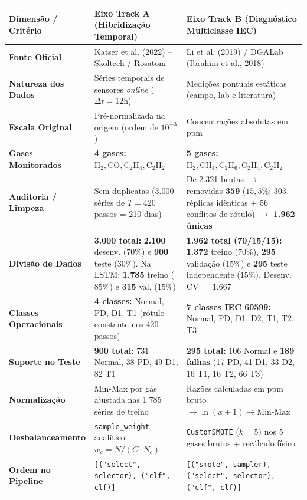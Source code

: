 \documentclass[10pt,a4paper]{article}
\begin{document}
\begin{table}[H]
\centering\footnotesize
\renewcommand{\arraystretch}{1.18}
\begin{tabularx}{\textwidth}{l X X}
\toprule
\textbf{Dimensão / Critério} & \textbf{Eixo Track A (Hibridização Temporal)} & \textbf{Eixo Track B (Diagnóstico Multiclasse IEC)} \\
\midrule
\textbf{Fonte Oficial} & Katser et al. (2022) -- Skoltech / Rosatom & Li et al. (2019) / DGALab (Ibrahim et al., 2018) \\
\textbf{Natureza dos Dados} & Séries temporais de sensores \textit{online} ($\Delta t = 12\text{h}$) & Medições pontuais estáticas (campo, lab e literatura) \\
\textbf{Escala Original} & Pré-normalizada na origem (ordem de $10^{-3}$) & Concentrações absolutas em $\text{ppm}$ \\
\textbf{Gases Monitorados} & \textbf{4 gases:} $\text{H}_2, \text{CO}, \text{C}_2\text{H}_4, \text{C}_2\text{H}_2$ & \textbf{5 gases:} $\text{H}_2, \text{CH}_4, \text{C}_2\text{H}_6, \text{C}_2\text{H}_4, \text{C}_2\text{H}_2$ \\
\textbf{Auditoria / Limpeza} & Sem duplicatas (3.000 séries de $T=420$ passos = 210 dias) & De 2.321 brutas $\to$ removidas \textbf{359} ($15{,}5\%$: 303 réplicas idênticas + 56 conflitos de rótulo) $\to$ \textbf{1.962 únicas} \\
\textbf{Divisão de Dados} & \textbf{3.000 total:} \textbf{2.100} desenv. ($70\%$) e \textbf{900} teste ($30\%$). Na LSTM: \textbf{1.785} treino ($85\%$) e \textbf{315} val. ($15\%$) & \textbf{1.962 total (70/15/15):} \textbf{1.372} treino ($70\%$), \textbf{295} validação ($15\%$) e \textbf{295} teste independente ($15\%$). Desenv. CV $= 1.667$ \\
\textbf{Classes Operacionais} & \textbf{4 classes:} Normal, PD, D1, T1 (rótulo constante nos 420 passos) & \textbf{7 classes IEC 60599:} Normal, PD, D1, D2, T1, T2, T3 \\
\textbf{Suporte no Teste} & \textbf{900 total:} 731 Normal, 38 PD, 49 D1, 82 T1 & \textbf{295 total:} 106 Normal e \textbf{189 falhas} (17 PD, 41 D1, 33 D2, 16 T1, 16 T2, 66 T3) \\
\textbf{Normalização} & Min-Max por gás ajustada nas 1.785 séries de treino & Razões calculadas em ppm bruto $\to \ln(x+1) \to \text{Min-Max}$ \\
\textbf{Desbalanceamento} & \texttt{sample\_weight} analítico: $w_c = N / (C \cdot N_c)$ & \texttt{CustomSMOTE} ($k=5$) nos 5 gases brutos + recálculo físico \\
\textbf{Ordem no Pipeline} & \texttt{[("select", selector), ("clf", clf)]} & \texttt{[("smote", sampler), ("select", selector), ("clf", clf)]} \\
\bottomrule
\end{tabularx}
\end{table}
\end{document}
